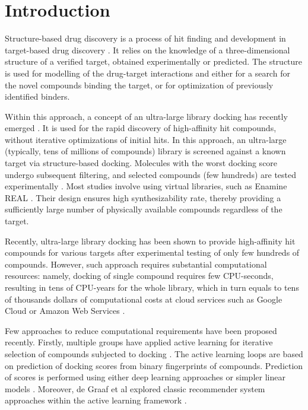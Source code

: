 \section{Introduction}

Structure-based drug discovery is a process of hit finding and development in target-based drug discovery \cite{ballante_structure-based_2021,sala_targeting_2023,congreve_impact_2020}. It relies on the knowledge of a three-dimensional structure of a verified target, obtained experimentally or predicted. The structure is used for modelling of the drug-target interactions and either for a search for the novel compounds binding the target, or for optimization of previously identified binders.

Within this approach, a concept of an ultra-large library docking has recently emerged \cite{Cavasotto2023}. It is used for the rapid discovery of high-affinity hit compounds, without iterative optimizations of initial hits. In this approach, an ultra-large (typically, tens of millions of compounds) library is screened against a known target via structure-based docking. Molecules with the worst docking score undergo subsequent filtering, and selected compounds (few hundreds) are tested experimentally \cite{bender_practical_2021}. Most studies involve using virtual libraries, such as Enamine REAL \cite{noauthor_real_nodate}. Their design ensures high synthesizability rate, thereby providing a sufficiently large number of physically available compounds regardless of the target.

Recently, ultra-large library docking has been shown to provide high-affinity hit compounds for various targets \cite{sigma2_paper, melatonin_paper, ultralarge_docking_first, gorgulla_open-source_2020, beroza_chemical_2022, noauthor_large_nodate, lu_structure-guided_2021, sadybekov_synthon-based_2022, sadybekov_structure-based_2020} after experimental testing of only few hundreds of compounds. However, such approach requires substantial computational resources: namely, docking of single compound requires few CPU-seconds, resulting in tens of CPU-years for the whole library, which in turn equals to tens of thousands dollars of computational costs at cloud services such as Google Cloud or Amazon Web Services \cite{irwin_large_2023,grebner_virtual_2020}.

Few approaches to reduce computational requirements have been proposed recently. Firstly, multiple groups have applied active learning for iterative selection of compounds subjected to docking \cite{Graff2021AcceleratingLearning,autoencoders_guided_learning,logistic_regression,deepdocking,leandocking,Yang2021_shoichet_active_learning}. The active learning loops are based on prediction of docking scores from binary fingerprints of compounds. Prediction of scores is performed using either deep learning approaches \cite{deepdocking,Yang2021_shoichet_active_learning,autoencoders_guided_learning, Graff2021AcceleratingLearning} or simpler linear models \cite{leandocking,logistic_regression}. Moreover, de Graaf et al explored classic recommender system approaches within the active learning framework \cite{Graff2021AcceleratingLearning}. 

